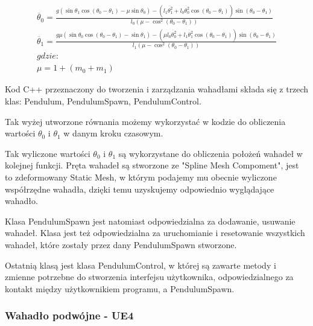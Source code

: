 \documentclass[a4paper,12pt,reqno]{article}
\begin{document}
\begin{equation}
\begin{split} 
\ddot{\theta_0}=\frac{g(\sin\theta_1\cos(\theta_0-\theta_1)-\mu\sin\theta_0)
-(l_1\dot{\theta_1^2}+l_0\dot{\theta_0^2}\cos(\theta_0-\theta_1))\sin(\theta_0-\theta_1)}{l_0(\mu-\cos^2(\theta_0-\theta_1))}
\\
\ddot{\theta_1}=\frac{g\mu(\sin\theta_0\cos(\theta_0-\theta_1)-\sin\theta_1)
-(\mu l_0\dot{\theta_0^2}+l_1\dot{\theta_1^2}\cos(\theta_0-\theta_1))\sin(\theta_0-\theta_1)}
{l_1(\mu-\cos^2(\theta_0-\theta_1))}
\\
gdzie:
\\
\mu=1+(m_0+m_1)
\end{split}
\label{computeAngularAcceleration}
\end{equation}

Kod C++ przeznaczony do tworzenia i zarządzania wahadłami składa się z trzech klas: Pendulum, PendulumSpawn, PendulumControl.

Tak wyżej utworzone równania możemy wykorzystać w kodzie do obliczenia wartości $\theta_0$ i $\theta_1$ w danym kroku czasowym.


\label{ComputeTheta}


Tak wyliczone wartości $\theta_0$ i $\theta_1$ są wykorzystane do obliczenia położeń wahadeł w kolejnej funkcji. Pręta wahadeł są stworzone ze "Spline Mesh Compoment", jest to zdeformowany Static Mesh, w którym podajemy mu obecnie wyliczone współrzędne wahadła, dzięki temu uzyskujemy odpowiednio wyglądające wahadło.




Klasa PendulumSpawn jest natomiast odpowiedzialna za dodawanie, usuwanie wahadeł. Klasa jest też odpowiedzialna za uruchomianie i resetowanie wszystkich wahadeł, które zostały przez dany PendulumSpawn stworzone.

Ostatnią klasą jest klasa PendulumControl, w której są zawarte metody i zmienne potrzebne do stworzenia interfejsu użytkownika, odpowiedzialnego za kontakt między użytkownikiem programu, a PendulumSpawn.

\subsubsection{Wahadło podwójne - UE4}
\end{document}
